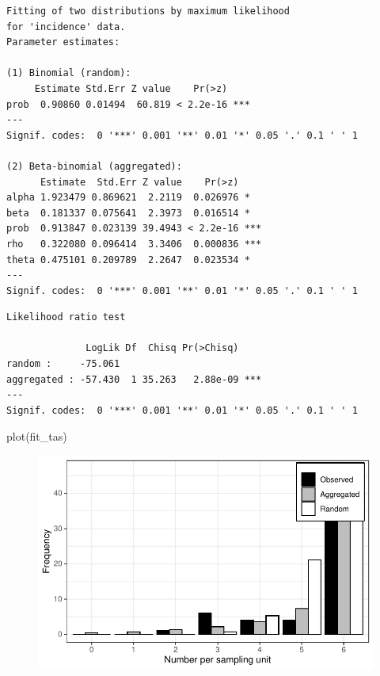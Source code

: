 \documentclass[
  letterpaper,
  DIV=11,
  numbers=noendperiod]{scrreprt}
\newenvironment{Shaded}{\begin{snugshade}}{\end{snugshade}}
\newcommand{\FunctionTok}[1]{\textcolor[rgb]{0.28,0.35,0.67}{#1}}
\newcommand{\NormalTok}[1]{\textcolor[rgb]{0.00,0.23,0.31}{#1}}
\newcommand{\SpecialCharTok}[1]{\textcolor[rgb]{0.37,0.37,0.37}{#1}}
\begin{document}
\begin{verbatim}
Fitting of two distributions by maximum likelihood
for 'incidence' data.
Parameter estimates:

(1) Binomial (random):
     Estimate Std.Err Z value    Pr(>z)    
prob  0.90860 0.01494  60.819 < 2.2e-16 ***
---
Signif. codes:  0 '***' 0.001 '**' 0.01 '*' 0.05 '.' 0.1 ' ' 1

(2) Beta-binomial (aggregated):
      Estimate  Std.Err Z value    Pr(>z)    
alpha 1.923479 0.869621  2.2119  0.026976 *  
beta  0.181337 0.075641  2.3973  0.016514 *  
prob  0.913847 0.023139 39.4943 < 2.2e-16 ***
rho   0.322080 0.096414  3.3406  0.000836 ***
theta 0.475101 0.209789  2.2647  0.023534 *  
---
Signif. codes:  0 '***' 0.001 '**' 0.01 '*' 0.05 '.' 0.1 ' ' 1
\end{verbatim}

\begin{Shaded}
\end{Shaded}

\begin{verbatim}
Likelihood ratio test

              LogLik Df  Chisq Pr(>Chisq)    
random :     -75.061                         
aggregated : -57.430  1 35.263   2.88e-09 ***
---
Signif. codes:  0 '***' 0.001 '**' 0.01 '*' 0.05 '.' 0.1 ' ' 1
\end{verbatim}

\begin{Shaded}
\begin{Highlighting}[]
\FunctionTok{plot}\NormalTok{(fit\_tas)}
\end{Highlighting}
\end{Shaded}

\begin{figure}[H]

{\centering \includegraphics{spatial-tests_files/figure-pdf/unnamed-chunk-71-1.pdf}

}

\end{figure}
\end{document}
